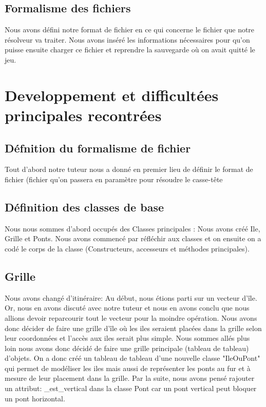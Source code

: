 \documentclass{article}
\begin{document}
    \subsection{\Large Formalisme des fichiers}
    \hspace{0.5cm} Nous avons défini notre format de fichier en ce qui concerne le fichier que notre résolveur va traiter. Nous avons inséré les informations nécessaires pour qu'on puisse ensuite charger ce fichier et reprendre la sauvegarde où on avait quitté le jeu. \newline

\section{\LARGE Developpement et difficultées principales recontrées}

    \subsection{\Large Défnition du formalisme de fichier}
    \hspace{0.5cm} Tout d'abord notre tuteur nous a donné en premier lieu de définir le format de fichier (fichier qu'on passera en paramètre pour résoudre le casse-tête
    \subsection{\Large Définition des classes de base}
    \hspace{0.5cm} Nous nous sommes d'abord occupés des Classes principales : Nous avons créé Ile, Grille et Ponts. Nous avons commencé par réfléchir aux classes et on ensuite on a codé le corps de la classe (Constructeurs, accesseurs et méthodes principales).
    \subsection{\Large Grille}
    \hspace{0.5cm} Nous avons changé d'itinéraire: Au début, nous étions parti sur un vecteur d'île. Or, nous en avons discuté avec notre tuteur et nous en avons conclu que nous allions devoir reparcourir tout le vecteur pour la moindre opération. Nous avons donc décider de faire une grille d'île où les iles seraient placées dans la grille selon leur coordonnées et l'accès aux iles serait plus simple. Nous sommes allés plus loin nous avons donc décidé de faire une grille principale (tableau de tableau) d'objets. On a donc créé un tableau de tableau d'une nouvelle classe "IleOuPont" qui permet de modéliser les iles mais aussi de représenter les ponts au fur et à mesure de leur placement dans la grille.
    Par la suite, nous avons pensé rajouter un attribut: \_est\_vertical dans la classe Pont car un pont vertical peut bloquer un pont horizontal.
\end{document}
